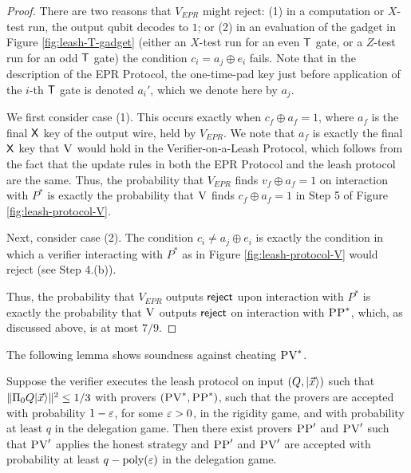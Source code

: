\begin{proof}
There are two reasons that $V_{EPR}$ might reject: (1) in a computation or $X$-test run, the output qubit decodes to $1$; or (2) in an evaluation of the gadget in Figure \ref{fig:leash-T-gadget} (either an $X$-test run for an even $\sf T$ gate, or a $Z$-test run for an odd $\sf T$ gate) the condition ${c}_i=a_j\oplus e_i$ fails. Note that in the description of the EPR Protocol, the one-time-pad key just before application of the $i$-th $\sf T$ gate is denoted $a_i'$, which we denote here by $a_j$. 

We first consider case (1). This occurs exactly when ${c_f}\oplus a_f=1$, where $a_f$ is the final $\sf X$ key of the output wire, held by $V_{EPR}$. We note that $a_f$ is exactly the final $\sf X$ key that $\textsc{V}$ would hold in the Verifier-on-a-Leash Protocol, which follows from the fact that the update rules in both the EPR Protocol and the leash protocol are the same. Thus, the probability that $V_{EPR}$ finds ${v_f}\oplus a_f=1$ on interaction with $P^*$ is exactly the probability that $\textsc{V}$ finds $c_f\oplus a_f=1$ in Step 5 of Figure \ref{fig:leash-protocol-V}. 

Next, consider case (2). The condition ${c}_i\neq a_{j}\oplus e_i$ is exactly
 the condition in which a verifier interacting with $P^*$ as in Figure \ref{fig:leash-protocol-V} would reject (see Step 4.(b)).

Thus, the probability that $V_{EPR}$ outputs $\sf reject$ upon interaction with $P^*$ is exactly the probability that $\textsc{V}$ outputs $\sf reject$ on interaction with $\textsc{PP}^*$, which, as discussed above, is at most $7/9$.
\end{proof}





\noindent The following lemma shows soundness against cheating $\textsc{PV}^*$.

\begin{lemma}\label{soundlemma}
Suppose the verifier executes the leash protocol  on input $(Q,|\vec{x}\rangle)$ such that $\|\Pi_0 Q|\vec{x}\rangle\|^2 \leq 1/3$ with provers $(\textsc{PV}^*,\textsc{PP}^*)$, such that the provers are accepted with probability $1-\varepsilon$, for some $\varepsilon>0$, in the rigidity game, and with probability at least $q$ in the delegation game. Then there exist provers $\textsc{PP}'$ and $\textsc{PV}'$ such that $\textsc{PV}'$ applies the honest strategy and $\textsc{PP}'$ and $\textsc{PV}'$ are accepted with probability at least $q-\operatorname{poly}(\varepsilon)$ in the delegation game.
\end{lemma}

